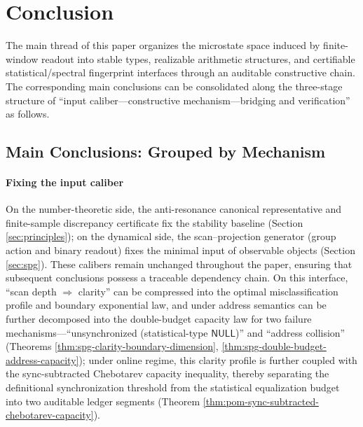 \section{Conclusion}\label{sec:conclusion}

The main thread of this paper organizes the microstate space induced by finite-window readout into stable types, realizable arithmetic structures, and certifiable statistical/spectral fingerprint interfaces through an auditable constructive chain. The corresponding main conclusions can be consolidated along the three-stage structure of ``input caliber---constructive mechanism---bridging and verification'' as follows.

\subsection{Main Conclusions: Grouped by Mechanism}\label{subsec:core-conclusions}
\paragraph{Fixing the input caliber}
On the number-theoretic side, the anti-resonance canonical representative and finite-sample discrepancy certificate fix the stability baseline (Section \ref{sec:principles}); on the dynamical side, the scan--projection generator (group action and binary readout) fixes the minimal input of observable objects (Section \ref{sec:spg}). These calibers remain unchanged throughout the paper, ensuring that subsequent conclusions possess a traceable dependency chain.
On this interface, ``scan depth \(\Rightarrow\) clarity'' can be compressed into the optimal misclassification profile and boundary exponential law, and under address semantics can be further decomposed into the double-budget capacity law for two failure mechanisms---``unsynchronized (statistical-type \(\mathsf{NULL}\))'' and ``address collision'' (Theorems \ref{thm:spg-clarity-boundary-dimension}, \ref{thm:spg-double-budget-address-capacity}); under online regime, this clarity profile is further coupled with the sync-subtracted Chebotarev capacity inequality, thereby separating the definitional synchronization threshold from the statistical equalization budget into two auditable ledger segments (Theorem \ref{thm:pom-sync-subtracted-chebotarev-capacity}).

